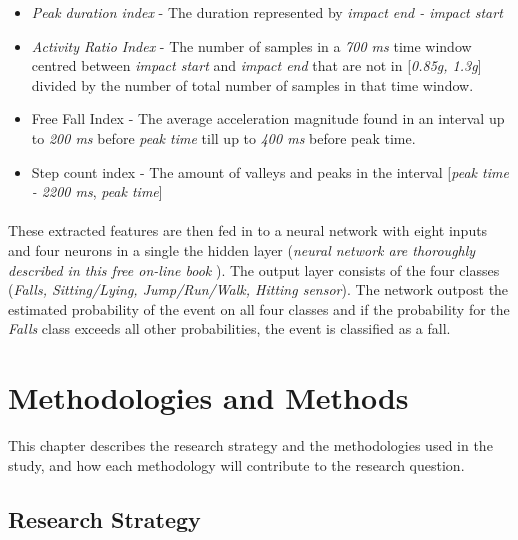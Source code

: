 \documentclass[12pt, a4paper, onecolumn]{article}
\begin{document}
\begin{itemize}
		\item \textit{Peak duration index} - The duration represented by \textit{impact end - impact start}
		\item \textit{Activity Ratio Index} - The number of samples in a \textit{700 ms} time window centred between \textit{impact start} and \textit{impact end} that are not in [\textit{0.85g, 1.3g}] divided by the number of total number of samples in that time window.
		
		\item{Free Fall Index} - The average acceleration magnitude found in an interval up to \textit{200 ms} before \textit{peak time} till up to \textit{400 ms} before peak time.
		
		\item{Step count index} - The amount of valleys and peaks in the interval [\textit{peak time - 2200 ms}, \textit{peak time}]
	\end{itemize}
	
	
	\paragraph{} These extracted features are then fed in to a neural network with eight inputs and four neurons in a single the hidden layer (\textit{neural network are thoroughly described in this free on-line book}  \cite{neural_networks}). The output layer consists of the four classes (\textit{Falls, Sitting/Lying, Jump/Run/Walk, Hitting sensor}). The network outpost the estimated probability of the event on all four classes and if the probability for the \textit{Falls}  class exceeds all other probabilities, the event is classified as a fall.
	
	
	
	\newpage
	\section{Methodologies and Methods}
	
	This chapter describes the research strategy and the methodologies used in the study, and how each methodology will contribute to the research question.
	
	\subsection{Research Strategy}
	
\end{document}
